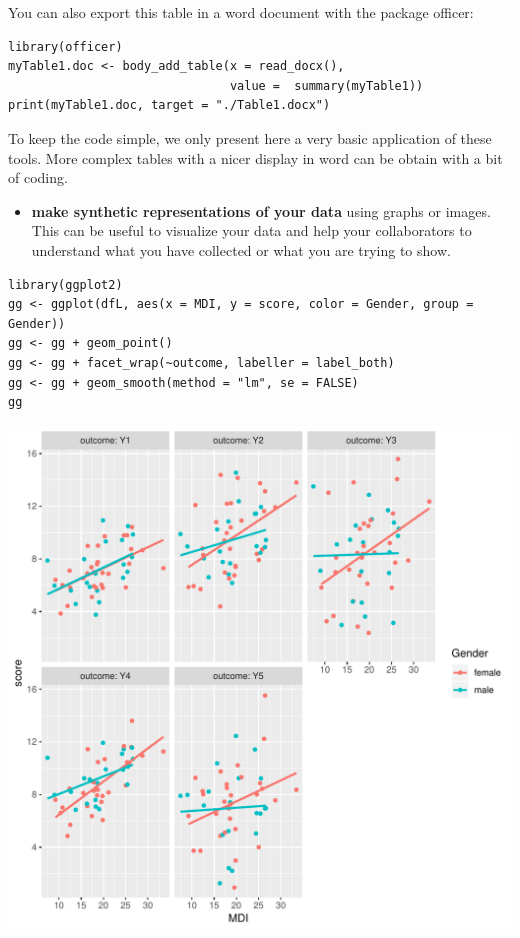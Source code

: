 \documentclass{article}
\begin{document}
You can also export this table in a word document with the package
officer:
\lstset{language=r,label= ,caption= ,captionpos=b,numbers=none}
\begin{lstlisting}
library(officer)
myTable1.doc <- body_add_table(x = read_docx(), 
							   value =  summary(myTable1)) 
print(myTable1.doc, target = "./Table1.docx")
\end{lstlisting}

To keep the code simple, we only present here a very basic application
of these tools. More complex tables with a nicer display in word can
be obtain with a bit of coding.

\clearpage

\begin{itemize}
\item \textbf{make synthetic representations of your data} using graphs or
images. This can be useful to visualize your data and help your
collaborators to understand what you have collected or what you are
trying to show.
\end{itemize}

\lstset{language=r,label= ,caption= ,captionpos=b,numbers=none}
\begin{lstlisting}
library(ggplot2)
gg <- ggplot(dfL, aes(x = MDI, y = score, color = Gender, group = Gender))
gg <- gg + geom_point()
gg <- gg + facet_wrap(~outcome, labeller = label_both)
gg <- gg + geom_smooth(method = "lm", se = FALSE)
gg
\end{lstlisting}

\begin{center}
\includegraphics[width=.9\linewidth]{./figures/descriptive.pdf}
\end{center}
\end{document}
